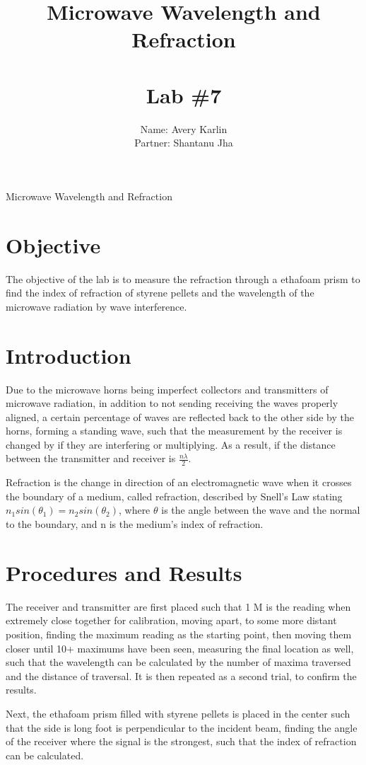 \documentclass[11pt, titlepage]{article}
\title{Microwave Wavelength and Refraction \\ \ \\ \large Lab \#7}
\author{Name: Avery Karlin \\ Partner: Shantanu Jha}
\date{}
\begin{document}
\maketitle

\begin{center}
\LARGE Microwave Wavelength and Refraction
\end{center}

\section*{Objective}
The objective of the lab is to measure the refraction through a ethafoam prism to find the index of refraction of styrene pellets and the wavelength of the microwave radiation by wave interference.

\section*{Introduction}
Due to the microwave horns being imperfect collectors and transmitters of microwave radiation, in addition to not sending receiving the waves properly aligned, a certain percentage of waves are reflected back to the other side by the horns, forming a standing wave, such that the measurement by the receiver is changed by if they are interfering or multiplying. As a result, if the distance between the transmitter and receiver is $\frac{n\lambda}{2}$.

Refraction is the change in direction of an electromagnetic wave when it crosses the boundary of a medium, called refraction, described by Snell's Law stating $n_1sin(\theta_1) = n_2sin(\theta_2)$, where $\theta$ is the angle between the wave and the normal to the boundary, and n is the medium's index of refraction.

\section*{Procedures and Results}
The receiver and transmitter are first placed such that 1 M is the reading when extremely close together for calibration, moving apart, to some more distant position, finding the maximum reading as the starting point, then moving them closer until 10+ maximums have been seen, measuring the final location as well, such that the wavelength can be calculated by the number of maxima traversed and the distance of traversal. It is then repeated as a second trial, to confirm the results.

Next, the ethafoam prism filled with styrene pellets is placed in the center  such that the side is long foot is perpendicular to the incident beam, finding the angle of the receiver where the signal is the strongest, such that the index of refraction can be calculated. 
\end{document}
